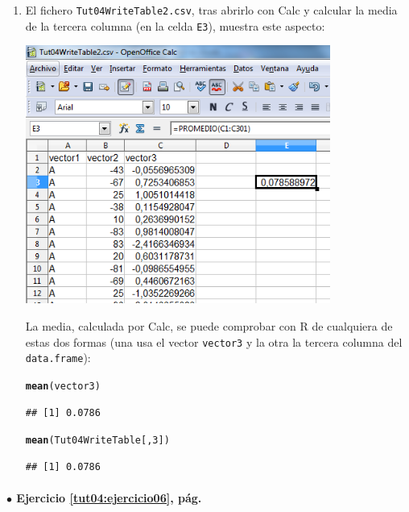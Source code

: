 \documentclass[10pt,a4paper]{article}\usepackage[]{graphicx}\usepackage[]{color}
\makeatletter
\newcommand{\hlnum}[1]{\textcolor[rgb]{0.686,0.059,0.569}{#1}}%
\newcommand{\hlstd}[1]{\textcolor[rgb]{0.345,0.345,0.345}{#1}}%
\newcommand{\hlkwd}[1]{\textcolor[rgb]{0.737,0.353,0.396}{\textbf{#1}}}%
\newenvironment{kframe}{%
 \def\at@end@of@kframe{}%
 \ifinner\ifhmode%
  \def\at@end@of@kframe{\end{minipage}}%
  \begin{minipage}{\columnwidth}%
 \fi\fi%
 \def\FrameCommand##1{\hskip\@totalleftmargin \hskip-\fboxsep
 \colorbox{shadecolor}{##1}\hskip-\fboxsep
     \hskip-\linewidth \hskip-\@totalleftmargin \hskip\columnwidth}%
 \MakeFramed {\advance\hsize-\width
   \@totalleftmargin\z@ \linewidth\hsize
   \@setminipage}}%
 {\par\unskip\endMakeFramed%
 \at@end@of@kframe}
\newenvironment{knitrout}{}{} %
\makeatother
\begin{document}
\begin{enumerate}
  \item El fichero {\tt Tut04WriteTable2.csv}, tras abrirlo con Calc y calcular la media de la tercera columna (en la celda {\tt E3}), muestra este aspecto:
  \begin{center}
  \includegraphics[width=10cm]{../fig/Tut04-20.png}
  \end{center}
  La media, calculada por Calc, se puede comprobar con R de cualquiera de estas dos formas (una usa el vector {\tt vector3} y la otra la tercera columna del {\tt data.frame}):
\begin{knitrout}
\color{fgcolor}\begin{kframe}
\begin{alltt}
\hlkwd{mean}\hlstd{(vector3)}
\end{alltt}
\begin{verbatim}
## [1] 0.0786
\end{verbatim}
\begin{alltt}
\hlkwd{mean}\hlstd{(Tut04WriteTable[,}\hlnum{3}\hlstd{])}
\end{alltt}
\begin{verbatim}
## [1] 0.0786
\end{verbatim}
\end{kframe}
\end{knitrout}





\end{enumerate}


\paragraph{\bf $\bullet$ Ejercicio \ref{tut04:ejercicio06}, pág. \pageref{tut04:ejercicio06}}
\label{tut04:ejercicio06:sol}\quad\\
\end{document}

